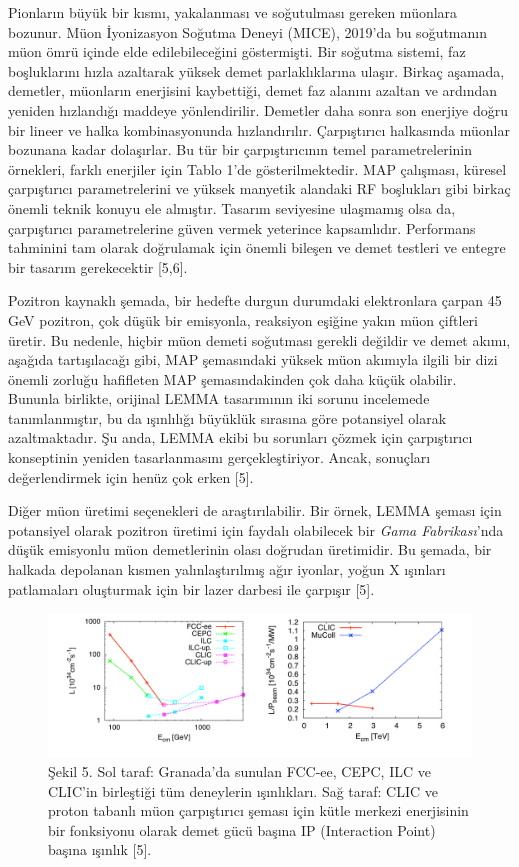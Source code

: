 \documentclass{article}
\begin{document}
 Pionların büyük bir kısmı, yakalanması ve soğutulması gereken müonlara bozunur. Müon İyonizasyon Soğutma Deneyi (MICE), 2019'da bu soğutmanın müon ömrü içinde elde edilebileceğini göstermişti. Bir soğutma sistemi, faz boşluklarını hızla azaltarak yüksek demet parlaklıklarına ulaşır.  Birkaç aşamada, demetler, müonların enerjisini kaybettiği, demet faz alanını azaltan ve ardından yeniden hızlandığı maddeye yönlendirilir. Demetler daha sonra son enerjiye doğru bir lineer ve halka kombinasyonunda hızlandırılır. Çarpıştırıcı halkasında müonlar bozunana kadar dolaşırlar. Bu tür bir çarpıştırıcının temel parametrelerinin örnekleri, farklı enerjiler için Tablo 1'de gösterilmektedir. MAP çalışması, küresel çarpıştırıcı parametrelerini ve yüksek manyetik alandaki RF boşlukları gibi birkaç önemli teknik konuyu ele almıştır. Tasarım seviyesine ulaşmamış olsa da, çarpıştırıcı parametrelerine güven vermek yeterince kapsamlıdır. Performans tahminini tam olarak doğrulamak için önemli bileşen ve demet testleri ve entegre bir tasarım gerekecektir [5,6].

Pozitron kaynaklı şemada, bir hedefte durgun durumdaki elektronlara çarpan 45 GeV pozitron, çok düşük bir emisyonla, reaksiyon eşiğine yakın müon çiftleri üretir. Bu nedenle, hiçbir müon demeti soğutması gerekli değildir ve demet akımı, aşağıda tartışılacağı gibi, MAP şemasındaki yüksek müon akımıyla ilgili bir dizi önemli zorluğu hafifleten MAP şemasındakinden çok daha küçük olabilir. Bununla birlikte, orijinal LEMMA tasarımının iki sorunu incelemede tanımlanmıştır, bu da ışınlılığı büyüklük sırasına göre potansiyel olarak azaltmaktadır. Şu anda, LEMMA ekibi bu sorunları çözmek için çarpıştırıcı konseptinin yeniden tasarlanmasını gerçekleştiriyor. Ancak, sonuçları değerlendirmek için henüz çok erken [5].

Diğer müon üretimi seçenekleri de araştırılabilir. Bir örnek, LEMMA şeması için potansiyel olarak pozitron üretimi için faydalı olabilecek bir \textit{ Gama Fabrikası}'nda düşük emisyonlu müon demetlerinin olası doğrudan üretimidir. Bu şemada, bir halkada depolanan kısmen yalınlaştırılmış ağır iyonlar, yoğun X ışınları patlamaları oluşturmak için bir lazer darbesi ile çarpışır [5].

\begin{figure}[h]
 \centering
\includegraphics[width=17.5cm]{image/Ekran Görüntüsü - 2021-06-23 11-28-44.png}
\caption*{Şekil 5. Sol taraf: Granada'da sunulan FCC-ee, CEPC, ILC ve CLIC'in birleştiği tüm deneylerin ışınlıkları. Sağ taraf: CLIC ve proton tabanlı müon çarpıştırıcı şeması için kütle merkezi enerjisinin bir fonksiyonu olarak demet gücü başına IP (Interaction Point) başına ışınlık [5].}
	\end{figure}
	
\end{document}
